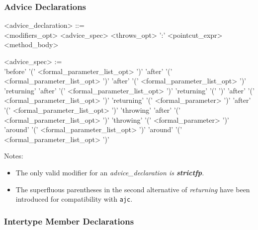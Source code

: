 \subsubsection{Advice Declarations}

\begin{minipage}{6in}
\begin{grammar}
<advice_declaration> ::= \hspace{1in} \\
      {\red <modifiers_opt>} <advice_spec> {\red <throws_opt>} ':'
      {\blue <pointcut_expr>} {\red <method_body>}

<advice_spec> :=  \hspace{1in} \\
       'before' '(' {\red <formal_parameter_list_opt>} ')'
\alt   'after'  '(' {\red <formal_parameter_list_opt>} ')'
\alt   'after'  '(' {\red <formal_parameter_list_opt>} ')' 'returning'
\alt   'after'  '(' {\red <formal_parameter_list_opt>} ')' 'returning' '(' ')'
\alt   'after'  '(' {\red <formal_parameter_list_opt>} ')' 'returning'
             '(' {\red <formal_parameter>} ')'
\alt   'after'  '(' {\red <formal_parameter_list_opt>} ')' 'throwing'
\alt   'after'  '(' {\red <formal_parameter_list_opt>} ')' 'throwing'
             '(' {\red <formal_parameter>} ')'
 'around' '(' {\red <formal_parameter_list_opt>} ')'
 'around' '(' {\red <formal_parameter_list_opt>} ')'
\end{grammar}
\end{minipage}

\noindent Notes:
\begin{itemize}
\item The only valid modifier for an \em{advice\_declaration} is 
{\bf strictfp}.
\item The superfluous parentheses in the second alternative of
{\it returning} have been introduced for compatibility with {\tt ajc}. 
\end{itemize}

\subsubsection{Intertype Member Declarations}

